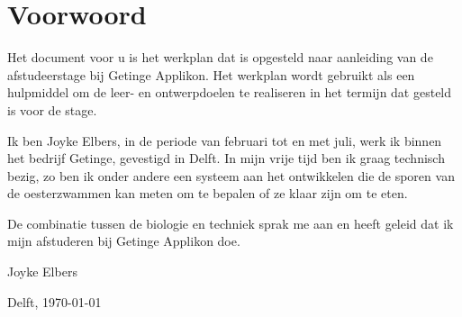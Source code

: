\section*{Voorwoord}
Het document voor u is het werkplan dat is opgesteld naar aanleiding van de afstudeerstage bij Getinge Applikon. Het werkplan wordt gebruikt als een hulpmiddel om de leer- en ontwerpdoelen te realiseren
in het termijn dat gesteld is voor de stage.

Ik ben Joyke Elbers, in de periode van februari tot en met juli, werk ik binnen het bedrijf Getinge, gevestigd in Delft. In mijn vrije tijd ben ik graag technisch bezig, zo ben ik onder andere een systeem aan het ontwikkelen die de sporen van de oesterzwammen kan meten om te bepalen of ze klaar zijn om te eten. 

De combinatie tussen de biologie en techniek sprak me aan en heeft geleid dat ik mijn afstuderen bij Getinge Applikon doe.  


Joyke Elbers

Delft, \today